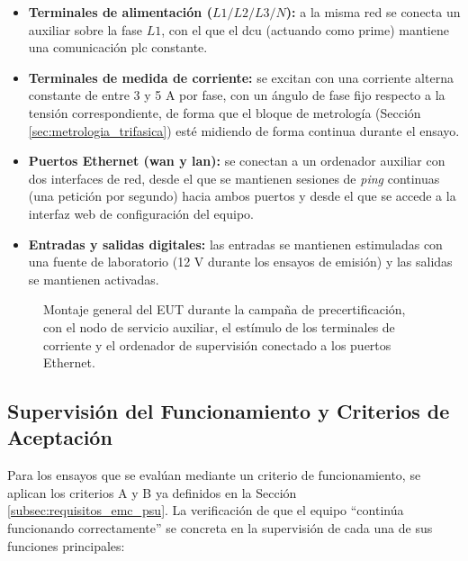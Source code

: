 \begin{itemize}
    \item \textbf{Terminales de alimentación ($L1/L2/L3/N$):} a la misma red se conecta un  auxiliar sobre la fase $L1$, con el que el \gls{dcu} (actuando como  \gls{prime}) mantiene una comunicación \gls{plc} constante.
    \item \textbf{Terminales de medida de corriente:} se excitan con una corriente alterna constante de entre 3 y 5 A por fase, con un ángulo de fase fijo respecto a la tensión correspondiente, de forma que el bloque de metrología (Sección \ref{sec:metrologia_trifasica}) esté midiendo de forma continua durante el ensayo.
    \item \textbf{Puertos Ethernet (\gls{wan} y \gls{lan}):} se conectan a un ordenador auxiliar con dos interfaces de red, desde el que se mantienen sesiones de \textit{ping} continuas (una petición por segundo) hacia ambos puertos y desde el que se accede a la interfaz web de configuración del equipo.
    \item \textbf{Entradas y salidas digitales:} las entradas se mantienen estimuladas con una fuente de laboratorio (12 V durante los ensayos de emisión) y las salidas se mantienen activadas.
\end{itemize}

\begin{figure}[htbp]
    \centering
    \caption{Montaje general del EUT durante la campaña de precertificación, con el nodo de servicio auxiliar, el estímulo de los terminales de corriente y el ordenador de supervisión conectado a los puertos Ethernet.}
    \label{fig:setup_general_ensayos}
\end{figure}

\subsection{Supervisión del Funcionamiento y Criterios de Aceptación}
\label{subsec:supervision_criterios}

Para los ensayos que se evalúan mediante un criterio de funcionamiento, se aplican los criterios A y B ya definidos en la Sección \ref{subsec:requisitos_emc_psu}. La verificación de que el equipo ``continúa funcionando correctamente'' se concreta en la supervisión de cada una de sus funciones principales:

